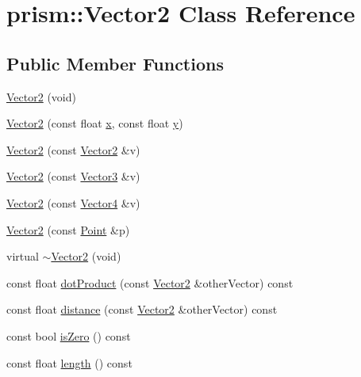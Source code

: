 \hypertarget{classprism_1_1_vector2}{}\section{prism\+:\+:Vector2 Class Reference}
\label{classprism_1_1_vector2}
\subsection*{Public Member Functions}
\begin{DoxyCompactItemize}
\item 
\hyperlink{classprism_1_1_vector2_a29d8912b19f7beb6c19d2c66c23d39a2}{Vector2} (void)
\item 
\hyperlink{classprism_1_1_vector2_a97bf11d5cfb424de6e1e08aea6e05c09}{Vector2} (const float \hyperlink{classprism_1_1_vector2_a03a3e6c084d4fda83cc688d22ffcf5bb}{x}, const float \hyperlink{classprism_1_1_vector2_a6656aa95639282560722da4b5da76423}{y})
\item 
\hyperlink{classprism_1_1_vector2_ad1c6e42316f2c2ce35b4ed98fa51c337}{Vector2} (const \hyperlink{classprism_1_1_vector2}{Vector2} \&v)
\item 
\hyperlink{classprism_1_1_vector2_a1a0101141991e43a9c3bfca9449bad59}{Vector2} (const \hyperlink{classprism_1_1_vector3}{Vector3} \&v)
\item 
\hyperlink{classprism_1_1_vector2_a6869031404a097577768cff206e9b7c2}{Vector2} (const \hyperlink{classprism_1_1_vector4}{Vector4} \&v)
\item 
\hyperlink{classprism_1_1_vector2_a375ed2db7c3f4e4d79544107a49b2841}{Vector2} (const \hyperlink{classprism_1_1_point}{Point} \&p)
\item 
virtual \hyperlink{classprism_1_1_vector2_aa45a4dd47779f3b4c7cbb1efdf067c0a}{$\sim$\+Vector2} (void)
\item 
const float \hyperlink{classprism_1_1_vector2_a5196ceef92212020885fe124adca3924}{dot\+Product} (const \hyperlink{classprism_1_1_vector2}{Vector2} \&other\+Vector) const 
\item 
const float \hyperlink{classprism_1_1_vector2_ac900226efb6a6a9b12aa5e19dfb57bf7}{distance} (const \hyperlink{classprism_1_1_vector2}{Vector2} \&other\+Vector) const 
\item 
const bool \hyperlink{classprism_1_1_vector2_ac24bf6ff6ebc3da7cba3cee1087f9fa4}{is\+Zero} () const 
\item 
const float \hyperlink{classprism_1_1_vector2_ab4141940a37d76a815b7c9b01dad93b6}{length} () const 

\end{DoxyCompactItemize}
